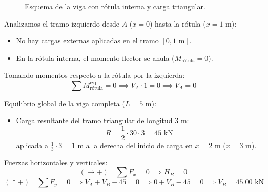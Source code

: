 \begin{figure}[H]
{%
    }
    \caption{Esquema de la viga con rótula interna y carga triangular.}
\end{figure}


Analizamos el tramo izquierdo desde $A$ ($x=0$) hasta la rótula ($x=1\text{ m}$):
\begin{itemize}
    \item No hay cargas externas aplicadas en el tramo $[0, 1\text{ m}]$.
    \item En la rótula interna, el momento flector se anula ($M_{\text{rótula}} = 0$).
\end{itemize}
Tomando momentos respecto a la rótula por la izquierda:
\begin{equation}
    \sum M_{\text{rótula}}^{\text{izq}} = 0 \implies V_A \cdot 1 = 0 \implies \boxed{V_A = 0}
\end{equation}

Equilibrio global de la viga completa ($L = 5\text{ m}$):
\begin{itemize}
    \item Carga resultante del tramo triangular de longitud $3\text{ m}$:
          \[
              R = \frac{1}{2} \cdot 30 \cdot 3 = 45\text{ kN}
          \]
          aplicada a $\frac{1}{3} \cdot 3 = 1\text{ m}$ a la derecha del inicio de carga en $x=2\text{ m}$ ($x = 3\text{ m}$).
\end{itemize}

Fuerzas horizontales y verticales:
\begin{equation}
    (\rightarrow +) \quad \sum F_x = 0 \implies \boxed{H_B = 0}
\end{equation}
\begin{equation}
    (\uparrow +) \quad \sum F_y = 0 \implies V_A + V_B - 45 = 0 \implies 0 + V_B - 45 = 0 \implies \boxed{V_B = 45.00\text{ kN}}
\end{equation}

